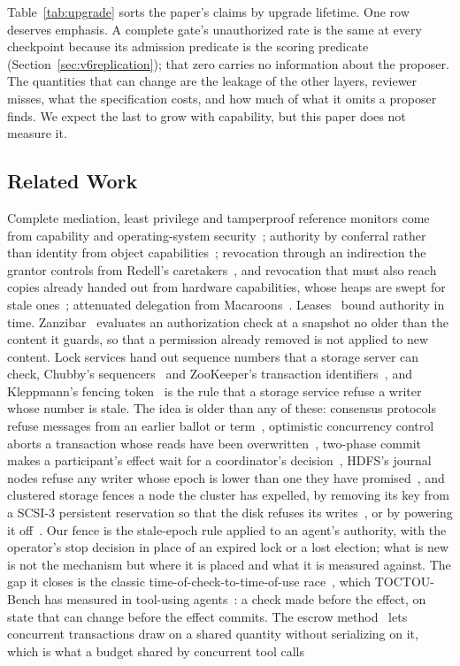 Table~\ref{tab:upgrade} sorts the paper's claims by upgrade lifetime. One row deserves emphasis. A complete gate's unauthorized rate is the same at every checkpoint because its admission predicate is the scoring predicate (Section~\ref{sec:v6replication}); that zero carries no information about the proposer. The quantities that can change are the leakage of the other layers, reviewer misses, what the specification costs, and how much of what it omits a proposer finds. We expect the last to grow with capability, but this paper does not measure it.

\subsection{Related Work}

 Complete mediation, least privilege and tamperproof reference monitors come from capability and operating-system security~\cite{dennis,saltzer,schneider}; authority by conferral rather than identity from object capabilities~\cite{miller2006}; revocation through an indirection the grantor controls from Redell's caretakers~\cite{redell1974}, and revocation that must also reach copies already handed out from hardware capabilities, whose heaps are swept for stale ones~\cite{filardo2020cornucopia}; attenuated delegation from Macaroons~\cite{birgisson2014}. Leases~\cite{gray1989leases} bound authority in time. Zanzibar~\cite{zanzibar} evaluates an authorization check at a snapshot no older than the content it guards, so that a permission already removed is not applied to new content. Lock services hand out sequence numbers that a storage server can check, Chubby's sequencers~\cite{burrows2006chubby} and ZooKeeper's transaction identifiers~\cite{hunt2010zookeeper}, and Kleppmann's fencing token~\cite{kleppmann2016} is the rule that a storage service refuse a writer whose number is stale. The idea is older than any of these: consensus protocols refuse messages from an earlier ballot or term~\cite{lamport1998paxos,ongaro2014raft}, optimistic concurrency control aborts a transaction whose reads have been overwritten~\cite{kung1981occ}, two-phase commit makes a participant's effect wait for a coordinator's decision~\cite{gray1978notes}, HDFS's journal nodes refuse any writer whose epoch is lower than one they have promised~\cite{lipcon2012qjm}, and clustered storage fences a node the cluster has expelled, by removing its key from a SCSI-3 persistent reservation so that the disk refuses its writes~\cite{spc3,fencescsi}, or by powering it off~\cite{robertson2000heartbeat}. Our fence is the stale-epoch rule applied to an agent's authority, with the operator's stop decision in place of an expired lock or a lost election; what is new is not the mechanism but where it is placed and what it is measured against. The gap it closes is the classic time-of-check-to-time-of-use race~\cite{bishop1996toctou}, which TOCTOU-Bench has measured in tool-using agents~\cite{lilienthal2025toctou}: a check made before the effect, on state that can change before the effect commits. The escrow method~\cite{oneil1986escrow} lets concurrent transactions draw on a shared quantity without serializing on it, which is what a budget shared by concurrent tool calls 